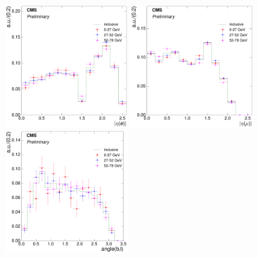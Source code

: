 \begin{figure}[hbtp]
    \centering
     \includegraphics[width=0.48\textwidth]{Chapters/04_Analysis/04b_XSections/images/8TeV/fit_variables/electron/WPT/electron_absolute_eta/qcd/WPT_electron_absolute_eta_0orMoreBtag_QCD_template_comparison.pdf}\hfill
     \includegraphics[width=0.48\textwidth]{Chapters/04_Analysis/04b_XSections/images/8TeV/fit_variables/muon/WPT/muon_absolute_eta/qcd/WPT_muon_absolute_eta_0orMoreBtag_QCD_template_comparison.pdf}\\
     \includegraphics[width=0.48\textwidth]{Chapters/04_Analysis/04b_XSections/images/8TeV/fit_variables/electron/WPT/angle_bl/qcd/WPT_angle_bl_1orMoreBtag_QCD_template_comparison.pdf}\hfill

\end{figure}
